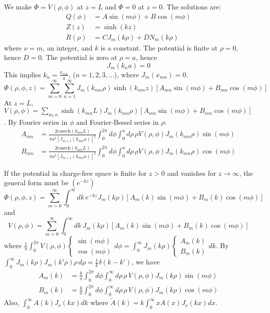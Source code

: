 \documentclass{article}
\begin{document}
	We make $\Phi = V(\rho, \phi)$ at $z=L$ and $\Phi=0$ at $z=0$. The solutions are:
	\begin{align*}
		Q(\phi) &= A \sin(m\phi) + B \cos(m\phi) \\
		Z(z) &= \sinh(kz) \\
		R(\rho) &= C J_m(k\rho) + D N_m(k\rho)
	\end{align*}
	where $\nu=m$, an integer, and $k$ is a constant. The potential is finite at $\rho=0$, hence $D=0$.
	The potential is zero at $\rho=a$, hence
	\begin{equation*}
		J_m(k_n a) = 0
	\end{equation*}
	This implies $k_n = \frac{x_{mn}}{a}$, ($n=1,2,3,\dots$), where $J_m(x_{mn}) = 0$.
	\begin{equation*}
		\Phi(\rho, \phi, z) = \sum_{m=0}^{\infty} \sum_{n=1}^{\infty} J_m(k_{mn}\rho) \sinh(k_{mn}z) [A_{mn}\sin(m\phi) + B_{mn}\cos(m\phi)]
	\end{equation*}
	At $z=L$, $V(\rho, \phi) = \sum_{m,n} \sinh(k_{mn}L) J_m(k_{mn}\rho) [A_{mn}\sin(m\phi) + B_{mn}\cos(m\phi)]$.
	By Fourier series in $\phi$ and Fourier-Bessel series in $\rho$:
	\begin{align*}
		A_{mn} &= \frac{2 \text{cosech}(k_{mn}L)}{\pi a^2 [J_{m+1}(k_{mn}a)]^2} \int_0^{2\pi} d\phi \int_0^a d\rho \, \rho V(\rho, \phi) J_m(k_{mn}\rho) \sin(m\phi) \\
		B_{mn} &= \frac{2 \text{cosech}(k_{mn}L)}{\pi a^2 [J_{m+1}(k_{mn}a)]^2} \int_0^{2\pi} d\phi \int_0^a d\rho \, \rho V(\rho, \phi) J_m(k_{mn}\rho) \cos(m\phi)
	\end{align*}
	
	If the potential in charge-free space is finite for $z>0$ and vanishes for $z \to \infty$, the general form must be $(e^{-kz})$
	\begin{equation*}
		\Phi(\rho, \phi, z) = \sum_{m=0}^{\infty} \int_0^\infty dk \, e^{-kz} J_m(k\rho) [A_m(k) \sin(m\phi) + B_m(k) \cos(m\phi)]
	\end{equation*}
	and
	\begin{equation*}
		V(\rho, \phi) = \sum_{m=0}^{\infty} \int_0^\infty dk \, J_m(k\rho) [A_m(k) \sin(m\phi) + B_m(k) \cos(m\phi)]
	\end{equation*}
	where $\frac{1}{\pi} \int_0^{2\pi} V(\rho,\phi) \begin{cases} \sin(m\phi) \\ \cos(m\phi) \end{cases} d\phi = \int_0^\infty J_m(k\rho) \begin{cases} A_m(k) \\ B_m(k) \end{cases} dk$.
	By $\int_0^\infty J_m(k\rho) J_m(k'\rho) \rho \, d\rho = \frac{1}{k} \delta(k-k')$, we have
	\begin{align*}
		A_m(k) &= \frac{k}{\pi} \int_0^{2\pi} d\phi \int_0^\infty d\rho \, \rho \, V(\rho, \phi) J_m(k\rho) \sin(m\phi) \\
		B_m(k) &= \frac{k}{\pi} \int_0^{2\pi} d\phi \int_0^\infty d\rho \, \rho \, V(\rho, \phi) J_m(k\rho) \cos(m\phi)
	\end{align*}
	Also, $\int_0^\infty A(k) J_\nu(kx) dk$ where $\tilde{A}(k) = k \int_0^\infty x A(x) J_\nu(kx) dx$.
	
\end{document}
